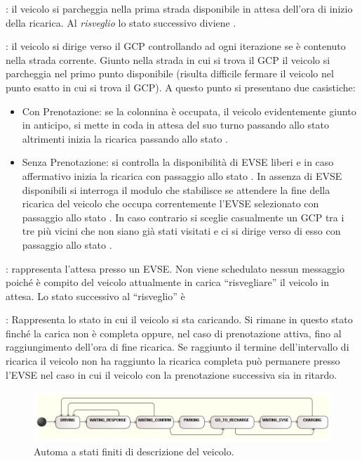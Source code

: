 \begin{description}
	\item {}: il veicolo si parcheggia nella prima strada disponibile in attesa dell'ora di inizio della ricarica. Al \emph{risveglio} lo stato successivo diviene .
	\item {}: il veicolo si dirige verso il GCP controllando ad ogni iterazione se è contenuto nella strada corrente. Giunto nella strada in cui si trova il GCP il veicolo si parcheggia nel primo punto disponibile (risulta difficile fermare il veicolo nel punto esatto in cui si trova il GCP). A questo punto si presentano due casistiche:
	\begin{itemize}
		\item{Con Prenotazione}: se la colonnina è occupata, il veicolo evidentemente giunto in anticipo, si mette in coda in attesa del suo turno passando allo stato  altrimenti inizia la ricarica passando allo stato .
		\item{Senza Prenotazione}: si controlla la disponibilità di EVSE liberi e in caso affermativo inizia la ricarica con passaggio allo stato . In assenza di EVSE disponibili si interroga il modulo  che stabilisce se  attendere la fine della ricarica del veicolo che occupa correntemente l'EVSE selezionato con passaggio allo stato . In caso contrario si sceglie casualmente un GCP tra i tre più vicini che non siano già stati visitati e ci si dirige verso di esso con passaggio allo stato . 
	\end{itemize}
	\item {}: rappresenta l'attesa presso un EVSE. Non viene schedulato nessun messaggio poiché è compito del veicolo attualmente in carica ``risvegliare'' il veicolo in attesa. Lo stato successivo al ``risveglio'' è 
	\item {}: Rappresenta lo stato in cui il veicolo si sta caricando. Si rimane in questo stato finché la carica non è completa oppure, nel caso di prenotazione attiva, fino al raggiungimento dell'ora di fine ricarica. Se raggiunto il termine dell'intervallo di ricarica il veicolo non ha raggiunto la ricarica completa può permanere presso l'EVSE nel caso in cui il veicolo con la prenotazione successiva sia in ritardo.
\end{description}
	
\begin{figure}[H]
	\centering
	\includegraphics[width=1.0\textwidth]{assets/car-fsmd.png}
	\caption{Automa a stati finiti di descrizione del veicolo.}
	\label{fig:car-fsmd}
\end{figure}

